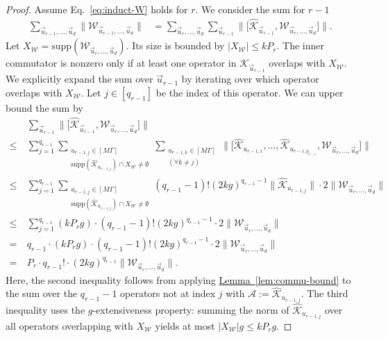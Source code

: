\documentclass[11pt]{article}
\newcommand{\lem}[1]{\hyperref[lem:#1]{Lemma~\ref*{lem:#1}}}
\newcommand{\supp}{\mathrm{supp}}
\newcommand{\mc}{\mathcal}
\begin{document}
\begin{proof}
    Assume Eq.~\eqref{eq:induct-W} holds for $r$. We consider the sum for $r-1$
    \begin{align*}
        \sum_{\vec{u}_{r-1}, \ldots, \vec{u}_d} \Big\|\mathcal{W}_{\vec{u}_{r-1}, \ldots, \vec{u}_d}\Big\| 
        &= \sum_{\vec{u}_{r}, \ldots, \vec{u}_d} \sum_{\vec{u}_{r-1}} \bigg\| \Big[ \hat{\mathcal{K}}_{\vec{u}_{r-1}}, \mathcal{W}_{\vec{u}_{r}, \ldots, \vec{u}_d} \Big] \bigg\|.
    \end{align*}
    Let $X_{\mathcal{W}} = \supp(\mathcal{W}_{\vec{u}_{r}, \ldots, \vec{u}_d})$. Its size is bounded by $|X_{\mathcal{W}}| \le k P_r$. The inner commutator is nonzero only if at least one operator in $\hat{\mathcal{K}}_{\vec{u}_{r-1}}$ overlaps with $X_{\mathcal{W}}$.
    We explicitly expand the sum over $\vec{u}_{r-1}$ by iterating over which operator overlaps with $X_{\mathcal{W}}$. Let $j \in [q_{r-1}]$ be the index of this operator. We can upper bound the sum by
    \begin{align*}
        & \sum_{\vec{u}_{r-1}} \bigg\| \Big[ \hat{\mathcal{K}}_{\vec{u}_{r-1}}, \mathcal{W}_{\vec{u}_{r}, \ldots, \vec{u}_d} \Big] \bigg\| \\
        \le~& \sum_{j=1}^{q_{r-1}} \sum_{\substack{u_{r-1, j} \in [M\Gamma] \\ \supp(\hat{\mathcal{K}}_{u_{r-1, j}}) \cap X_{\mathcal{W}} \neq \emptyset}} \sum_{\substack{u_{r-1, k} \in [M\Gamma] \\ (\forall k \neq j)}} \Big\| \big[ \hat{\mathcal{K}}_{u_{r-1,1}}, \ldots, \hat{\mathcal{K}}_{u_{r-1, q_{r-1}}}, \mathcal{W}_{\vec{u}_{r}, \ldots, \vec{u}_d} \big] \Big\| \\
        \le~& \sum_{j=1}^{q_{r-1}} \sum_{\substack{u_{r-1, j} \in [M\Gamma] \\ \supp(\hat{\mathcal{K}}_{u_{r-1, j}}) \cap X_{\mathcal{W}} \neq \emptyset}} (q_{r-1}-1)! (2kg)^{q_{r-1}-1} \|\hat{\mathcal{K}}_{u_{r-1, j}}\| \cdot 2 \Big\|\mathcal{W}_{\vec{u}_{r}, \ldots, \vec{u}_d}\Big\| \\
        \le~& \sum_{j=1}^{q_{r-1}} (k P_r g) \cdot (q_{r-1}-1)! (2kg)^{q_{r-1}-1} \cdot 2 \Big\|\mathcal{W}_{\vec{u}_{r}, \ldots, \vec{u}_d}\Big\| \\
        =~& q_{r-1} \cdot (k P_r g) \cdot (q_{r-1}-1)! (2kg)^{q_{r-1}-1} \cdot 2 \Big\|\mathcal{W}_{\vec{u}_{r}, \ldots, \vec{u}_d}\Big\| \\
        =~& P_r \cdot q_{r-1}! \cdot (2kg)^{q_{r-1}} \Big\|\mathcal{W}_{\vec{u}_{r}, \ldots, \vec{u}_d}\Big\|.
    \end{align*}
    Here, the second inequality follows from applying \lem{commu-bound} to the sum over the $q_{r-1}-1$ operators not at index $j$ with $\mc A:= \hat{\mathcal{K}}_{u_{r-1, j}}$.  The third inequality uses the $g$-extensiveness property: summing the norm of $\hat{\mathcal{K}}_{u_{r-1, j}}$ over all operators overlapping with $X_{\mathcal{W}}$ yields at most $|X_{\mathcal{W}}|g \le k P_r g$.
    

\end{proof}
\end{document}
